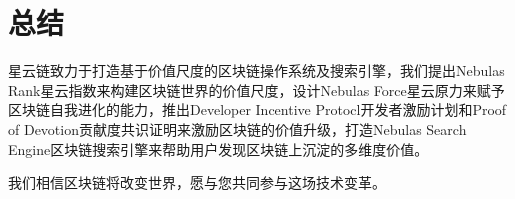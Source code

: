 \section{总结}
\label{sec:conclusion}

星云链致力于打造基于价值尺度的区块链操作系统及搜索引擎，我们提出Nebulas Rank星云指数来构建区块链世界的价值尺度，设计Nebulas Force星云原力来赋予区块链自我进化的能力，推出Developer Incentive Protocl开发者激励计划和Proof of Devotion贡献度共识证明来激励区块链的价值升级，打造Nebulas Search Engine区块链搜索引擎来帮助用户发现区块链上沉淀的多维度价值。

我们相信区块链将改变世界，愿与您共同参与这场技术变革。